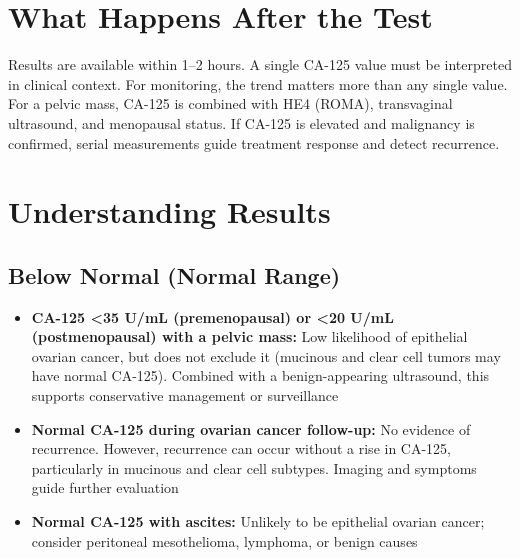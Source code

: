 \section*{What Happens After the Test}
Results are available within 1--2 hours. A single CA-125 value must be interpreted in clinical context. For monitoring, the trend matters more than any single value. For a pelvic mass, CA-125 is combined with HE4 (ROMA), transvaginal ultrasound, and menopausal status. If CA-125 is elevated and malignancy is confirmed, serial measurements guide treatment response and detect recurrence.

\section*{Understanding Results}

\subsection*{Below Normal (Normal Range)}
\begin{itemize}
  \item \textbf{CA-125 <35 U/mL (premenopausal) or <20 U/mL (postmenopausal) with a pelvic mass:} Low likelihood of epithelial ovarian cancer, but does not exclude it (mucinous and clear cell tumors may have normal CA-125). Combined with a benign-appearing ultrasound, this supports conservative management or surveillance
  \item \textbf{Normal CA-125 during ovarian cancer follow-up:} No evidence of recurrence. However, recurrence can occur without a rise in CA-125, particularly in mucinous and clear cell subtypes. Imaging and symptoms guide further evaluation
  \item \textbf{Normal CA-125 with ascites:} Unlikely to be epithelial ovarian cancer; consider peritoneal mesothelioma, lymphoma, or benign causes
\end{itemize}

